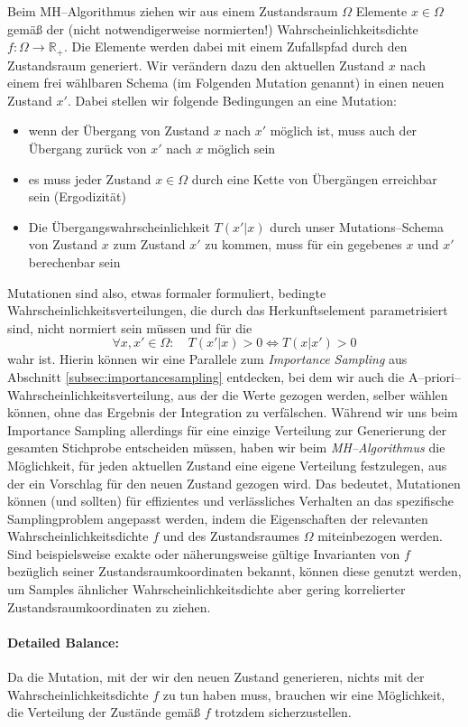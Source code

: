 	Beim MH--Algorithmus ziehen wir aus einem Zustandsraum $\Omega$ Elemente $x \in \Omega$ gemäß der (nicht notwendigerweise normierten!) Wahrscheinlichkeitsdichte $f : \Omega \rightarrow \mathbb{R}_+$. Die Elemente werden dabei mit einem Zufallspfad durch den Zustandsraum generiert. Wir verändern dazu den aktuellen Zustand $x$ nach einem frei wählbaren Schema (im Folgenden Mutation genannt) in einen neuen Zustand $x'$.
	Dabei stellen wir folgende Bedingungen an eine Mutation:
	\begin{itemize}
		\item{wenn der Übergang von Zustand $x$ nach $x'$ möglich ist, muss auch der Übergang zurück von $x'$ nach $x$ möglich sein}
		\item{es muss jeder Zustand $x \in \Omega$ durch eine Kette von Übergängen erreichbar sein (Ergodizität)}
		\item{Die Übergangswahrscheinlichkeit $T(x'|x)$ durch unser Mutations--Schema von Zustand $x$ zum Zustand $x'$ zu kommen, muss für ein gegebenes $x$ und $x'$ berechenbar sein}
	\end{itemize}
	Mutationen sind also, etwas formaler formuliert, bedingte Wahrscheinlichkeitsverteilungen, die durch das Herkunftselement parametrisiert sind, nicht normiert sein müssen und für die
	$$\forall x,x'\in\Omega : \quad T(x'|x)>0 \Leftrightarrow T(x|x')>0$$
	wahr ist. Hierin können wir eine Parallele zum {\em Importance Sampling} aus Abschnitt \ref{subsec:importancesampling} entdecken, bei dem wir auch die A--priori--Wahr\-schein\-lich\-keits\-ver\-tei\-lung, aus der die Werte gezogen werden, selber wählen können, ohne das Ergebnis der Integration zu verfälschen. Während wir uns beim Importance Sampling allerdings für eine einzige Verteilung zur Generierung der gesamten Stichprobe entscheiden müssen, haben wir beim {\em MH--Algorithmus} die Möglichkeit, für jeden aktuellen Zustand eine eigene Verteilung festzulegen, aus der ein Vorschlag für den neuen Zustand gezogen wird.
	Das bedeutet, Mutationen können (und sollten) für effizientes und verlässliches Verhalten an das spezifische Samplingproblem angepasst werden, indem die Eigenschaften der relevanten Wahrscheinlichkeitsdichte $f$ und des Zustandsraumes $\Omega$ miteinbezogen werden. Sind beispielsweise exakte oder näherungsweise gültige Invarianten von $f$ bezüglich seiner Zustandsraumkoordinaten bekannt, können diese genutzt werden, um Samples ähnlicher Wahrscheinlichkeitsdichte aber gering korrelierter Zustandsraumkoordinaten zu ziehen.
	
		
	\paragraph{Detailed Balance:}
	Da die Mutation, mit der wir den neuen Zustand generieren, nichts mit der Wahrscheinlichkeitsdichte $f$ zu tun haben muss, brauchen wir eine Möglichkeit, die Verteilung der Zustände gemäß $f$ trotzdem sicherzustellen.
	
